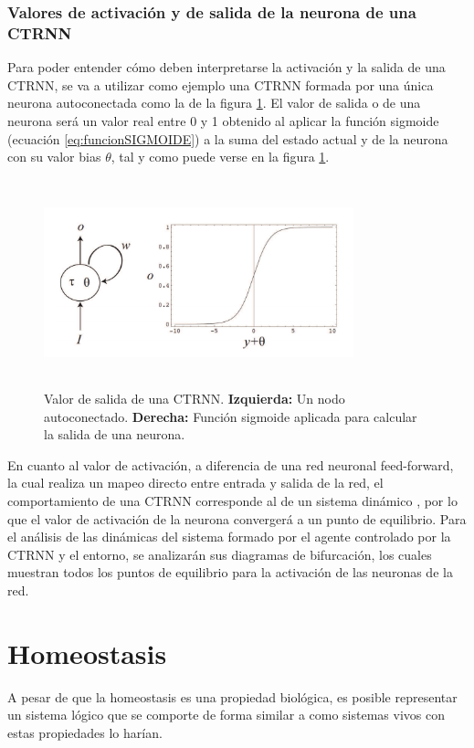 \subsubsection{Valores de activación y de salida de la neurona de una CTRNN}
Para poder entender cómo deben interpretarse la activación y la salida de una CTRNN, se va
a utilizar como ejemplo una CTRNN formada por una única neurona autoconectada como la de la figura \ref{fig:figuraCTRNNBasica}.
El valor de salida o de una neurona será un valor real entre 0 y 1 obtenido al aplicar la función
sigmoide (ecuación \ref{eq:funcionSIGMOIDE}) a la suma del estado actual y de la neurona con su valor bias $\theta$, tal y
como puede verse en la figura \ref{fig:figuraCTRNNBasica}.
\begin{figure}[H]
    \centering
    \includegraphics[width=0.8\textwidth,height=6cm]{Imagenes/CTRNNBasica}
    \caption{Valor de salida de una CTRNN. \textbf{Izquierda:} Un nodo autoconectado. \textbf{Derecha:} Función sigmoide aplicada para calcular la salida de una neurona.}
    \label{fig:figuraCTRNNBasica}
\end{figure}

En cuanto al valor de activación, a diferencia de una red neuronal feed-forward, la cual realiza
un mapeo directo entre entrada y salida de la red, el comportamiento de una CTRNN corresponde
al de un sistema dinámico \cite{BeerRD}, por lo que el valor de activación de la neurona convergerá
a un punto de equilibrio. Para el análisis de las dinámicas del sistema formado por el agente
controlado por la CTRNN y el entorno, se analizarán sus diagramas de bifurcación, los cuales
muestran todos los puntos de equilibrio para la activación de las neuronas de la red.

\section{Homeostasis}
A pesar de que la homeostasis es una propiedad biológica, es posible representar un sistema lógico que se comporte de forma similar a como
sistemas vivos con estas propiedades lo harían\cite{Hywel}.

